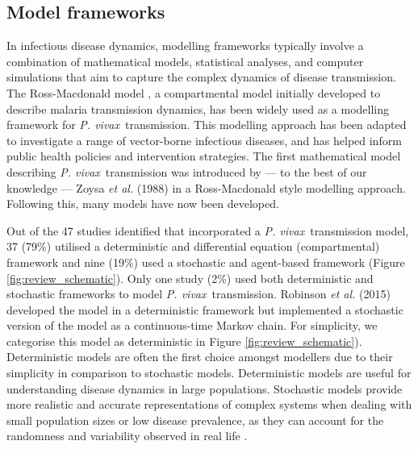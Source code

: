 \documentclass[12pt]{article}
\newcommand{\pv}{\textit{P. vivax}}
\newcommand{\etal}{\textit{et al. }}
\begin{document}
\subsection{Model frameworks}

In infectious disease dynamics, modelling frameworks typically involve a combination of mathematical models, statistical analyses, and computer simulations that aim to capture the complex dynamics of disease transmission. The Ross-Macdonald model \cite{macdonald1957epidemiology}, a compartmental model initially developed to describe malaria transmission dynamics, has been widely used as a modelling framework for \pv~transmission. This modelling approach has been adapted to investigate a range of vector-borne infectious diseases, and has helped inform public health policies and intervention strategies. 
The first mathematical model describing \pv~transmission was introduced by \mbox{---} to the best of our knowledge \mbox{---} Zoysa \textit{et al.} (1988) \cite{de1988modulation} in a Ross-Macdonald style modelling approach. Following this, many models have now been developed.

Out of the 47 studies identified that incorporated a \pv~transmission model, 37 (79\%) utilised a deterministic and differential equation (compartmental) framework \cite{de1988modulation,de1991mathematical,ishikawa2000prevalence,kammanee2001basic,ishikawa2003mathematical,fujita2006modeling,pongsumpun2007transmission,pongsumpun2008plasmodium,pongsumpun2008mathematical,pongsumpun2010impact,nah2010dilution,aguas2012modeling,chamchod2013modeling,roy2013potential,huo2014stability,white2014modelling,robinson2015strategies,white2016variation,prihantini2017stability,kammanee2019mathematical,gebremichaelrelapse,kim2019effects,silal2019malaria,kim2020mathematical,corder2020modelling,nyaberi2020mathematical,ghosh2020mathematical,baihaqi2020modelling,aldila2021superinfection,abimbade2022recurrent,tasman2022assessing,mehra2022hypnozoite,anwar2022multiscale,olaniyi2023optimal,anwar2023optimal,ahkrizal2023dynamics,olaniyi2023efficiency} and nine (19\%) used a stochastic and agent-based framework \cite{pizzitutti2015validated,white2018mathematical,gharakhanlou2019developing,huber2021radical,nekkab2021estimated,white2022potential,obadia2022developing,walker2023model,nekkab2023accelerating} (Figure \ref{fig:review_schematic}). Only one study (2\%) used both deterministic and stochastic frameworks \cite{robinson2015strategies} to model \pv~transmission. Robinson \etal(2015) \cite{robinson2015strategies} developed the model in a deterministic framework but implemented a stochastic version of the model as a continuous-time Markov chain. For simplicity, we categorise this model as deterministic in Figure \ref{fig:review_schematic}). Deterministic models are often the first choice amongst modellers due to their simplicity in comparison to stochastic models. Deterministic models are useful for understanding disease dynamics in large populations. Stochastic models provide more realistic and accurate representations of complex systems when dealing with small population sizes or low disease prevalence, as they can account for the randomness and variability observed in real life \cite{allen2000comparison,beran1994statistics}. 
\end{document}
